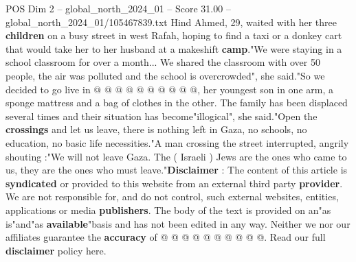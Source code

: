 \begin{textsample}{POS Dim 2 – global\_north\_2024\_01 – Score 31.00 – global\_north\_2024\_01/105467839.txt}
Hind Ahmed, 29, waited with her three \textbf{children} on a busy street in west Rafah, hoping to find a taxi or a donkey cart that would take her to her husband at a makeshift \textbf{camp}."We were staying in a school classroom for over a month...
We shared the classroom with over 50 people, the air was polluted and the school is overcrowded", she said."So we decided to go live in @ @ @ @ @ @ @ @ @ @, her youngest son in one arm, a sponge mattress and a bag of clothes in the other.
The family has been displaced several times and their situation has become"illogical", she said."Open the \textbf{crossings} and let us leave, there is nothing left in Gaza, no schools, no education, no basic life necessities."A man crossing the street interrupted, angrily shouting :"We will not leave Gaza.
The ( Israeli ) Jews are the ones who came to us, they are the ones who must leave."\textbf{Disclaimer} : The content of this article is \textbf{syndicated} or provided to this website from an external third party \textbf{provider}.
We are not responsible for, and do not control, such external websites, entities, applications or media \textbf{publishers}.
The body of the text is provided on an"as is"and"as \textbf{available}"basis and has not been edited in any way.
Neither we nor our affiliates guarantee the \textbf{accuracy} of @ @ @ @ @ @ @ @ @ @.
Read our full \textbf{disclaimer} policy here.

\end{textsample}
